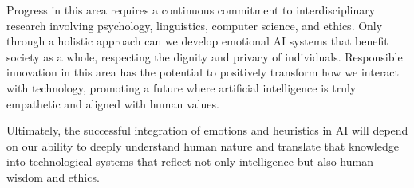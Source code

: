 \documentclass[a4paper,12pt]{report}
\begin{document}
	Progress in this area requires a continuous commitment to interdisciplinary research involving psychology, linguistics, computer science, and ethics. Only through a holistic approach can we develop emotional AI systems that benefit society as a whole, respecting the dignity and privacy of individuals. Responsible innovation in this area has the potential to positively transform how we interact with technology, promoting a future where artificial intelligence is truly empathetic and aligned with human values.
	
	Ultimately, the successful integration of emotions and heuristics in AI will depend on our ability to deeply understand human nature and translate that knowledge into technological systems that reflect not only intelligence but also human wisdom and ethics.
	
	\newpage
	
	\printbibliography
	
\end{document}
